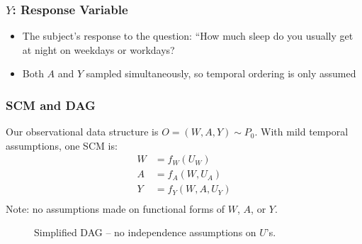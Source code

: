 \documentclass{beamer}
\begin{document}
\begin{frame}
 \frametitle{$Y$: Response Variable}
  \begin{itemize}
    \item The subject's response to the question: ``How much sleep do you usually get at night on weekdays or workdays?
    \item Both $A$ and $Y$ sampled simultaneously, so temporal ordering is only assumed
  \end{itemize}

\end{frame}

\begin{frame}
\frametitle{SCM and DAG}
\begin{center}
\begin{minipage}{0.55\linewidth}
Our observational data structure is $O=(W,A,Y)\sim P_0$. With mild temporal assumptions, one SCM is:
\begin{align*}
W &= f_{W}(U_{W}) \\
A &= f_{A}(W,U_{A}) \\
Y &= f_{Y}(W,A,U_{Y}) \\
\end{align*}
Note: no assumptions made on functional forms of $W$, $A$, or $Y$.
\end{minipage}
\begin{minipage}{0.4\linewidth}
  \begin{figure}[h]
    \centering
  \caption{Simplified DAG -- no independence assumptions on $U$'s.}
  \label{fig:DAG}
  \end{figure}
\end{minipage}
\end{center}
\end{frame}
\end{document}
